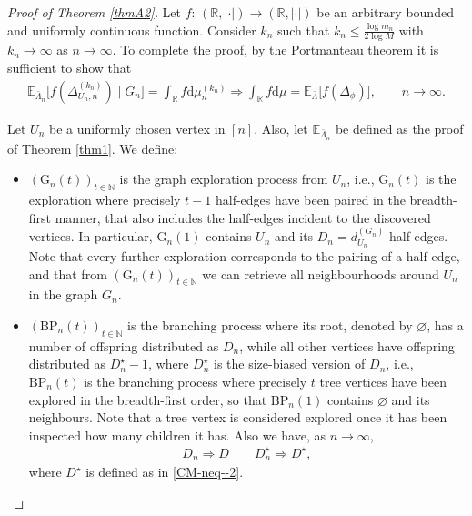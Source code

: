 \documentclass[11pt]{article}
\numberwithin{equation}{section}
\theoremstyle{plain}
\newcommand{\N}{\mathbb N}
\newcommand{\R}{\mathbb R}
\newcommand{\dd}{\mathrm{d}}
\newcommand{\weak}{\Longrightarrow}
\newcommand{\E}{\mathbb E}
\newcommand{\dn}{d^{(G_{n})}}
\begin{document}
\begin{proof}[Proof of Theorem \ref{thmA2}]
Let $f\colon\,(\R,\vert\cdot\vert) \to (\R,\vert\cdot\vert)$ be an arbitrary bounded and uniformly continuous function. Consider $k_{n}$ such that $k_{n}\leq \frac{\log m_{n}}{2\log M}$ with $k_{n}\to\infty$ as $n\to\infty$. To complete the proof, by the Portmanteau theorem it is sufficient to show that
\begin{align}
\label{CM-new-1}
\E_{\bar{\Lambda}_{n}}\big[f(\Delta_{U_n,n}^{(k_n)}) \mid G_{n}\big]=\int_\R f\dd\mu_{n}^{(k_n)}  \weak \int_\R f\dd\mu=\E_{\bar{\Lambda}}\big[f(\Delta_{\phi})\big],\qquad n\to\infty .
\end{align}

Let $U_{n}$ be a uniformly chosen vertex in $[n]$. Also, let $\E_{\bar{\Lambda}_{n}}$ be defined as the proof of Theorem \ref{thm1}. We define:
\begin{itemize}
\item 
$(\mathrm{G}_{n}(t))_{t\in\N}$ is the graph exploration process from $U_n$, i.e., $\mathrm{G}_{n}(t)$ is the exploration where precisely $t-1$ half-edges have been paired in the breadth-first manner, that also includes the half-edges incident to the discovered vertices. In particular, $\mathrm{G}_{n}(1)$ contains $U_n$ and its $D_n=\dn_{U_n}$ half-edges. Note that every further exploration corresponds to the pairing of a half-edge, and that from $(\mathrm{G}_{n}(t))_{t\in\N}$ we can retrieve all neighbourhoods around $U_n$ in the graph $G_n$. 
\item 
$(\mathrm{BP}_{n}(t))_{t\in\N}$ is the branching process where its root, denoted by $\varnothing$, has a number of offspring distributed as $D_n$, while all other vertices have offspring distributed as $D_{n}^{\star}-1$, where $D_{n}^{\star}$ is the size-biased version of $D_n$, i.e., $\mathrm{BP}_{n}(t)$ is the branching process where  precisely $t$ tree vertices have been explored in the breadth-first order, so that $\mathrm{BP}_{n}(1)$ contains $\varnothing$ and its neighbours. Note that a tree vertex is considered explored once it has been inspected how many children it has. Also we have, as $n\to\infty$,
\begin{align}
\label{CM-new-0}
D_{n}\weak D  \qquad D_{n}^{\star}\weak D^{\star},
\end{align}
where $D^{\star}$ is defined as in \eqref{CM-neq--2}.
\end{itemize}


\end{proof}
\end{document}
